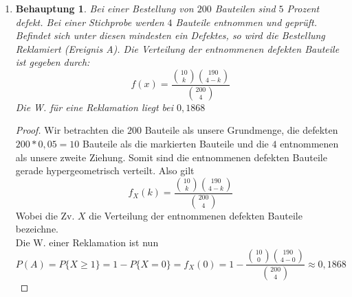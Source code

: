 \documentclass[a4paper]{scrartcl}
\newtheorem*{behaupt}{Behauptung}
\begin{document}
\begin{enumerate}[label=\bfseries\arabic*.]
    \item
    	\begin{behaupt}
    		Bei einer Bestellung von $200$ Bauteilen sind $5$ Prozent defekt.
    		Bei einer Stichprobe werden $4$ Bauteile entnommen und geprüft.
    		Befindet sich unter diesen mindesten ein Defektes, so wird die
    		Bestellung Reklamiert (Ereignis A). Die Verteilung der entnommenen
    		defekten Bauteile ist gegeben durch:
    		\[f(x)=\frac{ \binom{10}{k} \binom{190}{4-k} }{\binom{200}{4}}\]
    		Die W. für eine Reklamation liegt bei $0,1868$
    	\end{behaupt}
    	\begin{proof}
    		Wir betrachten die $200$ Bauteile als unsere Grundmenge, die defekten
    		$200*0,05=10$ Bauteile als die markierten Bauteile und die $4$
    		entnommenen als unsere zweite Ziehung. Somit sind die entnommenen
    		defekten Bauteile gerade hypergeometrisch verteilt. Also gilt
    		\[f_X(k)=\frac{\binom{10}{k}\binom{190}{4-k}}{\binom{200}{4}}\]
    		Wobei die Zv. $X$ die Verteilung der entnommenen defekten Bauteile
    		bezeichne.\\
    		Die W. einer Reklamation ist nun
    		\[P(A)=P\{X\ge 1\}=1-P\{X=0\}=f_X(0)=1-\frac{\binom{10}{0}
    		\binom{190}{4-0}}{\binom{200}{4}}\approx 0,1868\]
    	\end{proof}
    	

\end{enumerate}
\end{document}
